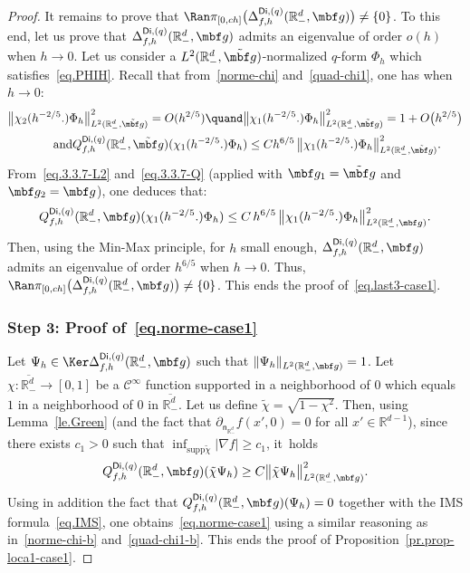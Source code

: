 \begin{proof}
It remains to prove that $\Ran \pi_{[0,ch]}\bigl(\Delta_{f,h}^{\mathsf{Di},(q)}(\mathbb R_-^d, \mbf g) \bigr)\neq \{0\}$. To this end, let us prove that $
\Delta_{f,h}^{\mathsf{Di},(q)}(\mathbb R^d_-,\mbf g)$ admits an eigenvalue of order $o(h)$ when $h\to 0$.
Let us consider a $L^2(\mathbb R^d_-,\tilde{\mbf g})$-normalized $q$-form $\Phi_h$ which satisfies~\eqref{eq.PHIH}.
Recall that from~\eqref{norme-chi} and~\eqref{quad-chi1}, one has when $h\to 0$:
\begin{gather*}
\big\Vert \chi_2(h^{-2/5 }.) \Phi_h\big \Vert_{L^2(\mathbb R_-^d,\tilde{\mbf g})}^2 =O(h^{2/5 }) \quand \big\Vert \chi_1(h^{-2/5 }.) \Phi_h\big\Vert_{L^2(\mathbb R_-^d,\tilde{\mbf g})}^2=1+O\bigl(h^{2/5 }\bigr)
\\
\tag*{and}
Q_{f,h}^{\mathsf{Di},(q)}(\mathbb R^d_-,\tilde{\mbf g})(\chi_1(h^{-2/5 }.)\Phi_h)\le C h^{ 6/5} \, \big \Vert \chi_1(h^{-2/5 }.)\Phi_h\big \Vert_{L^2(\mathbb R^d_-,\tilde{\mbf g})}^2.
\end{gather*}
From~\eqref{eq.3.3.7-L2} and~\eqref{eq.3.3.7-Q} (applied with $\mbf g_1=\tilde{\mbf g}$ and $\mbf g_2=\mbf g$), one deduces that:
\begin{equation}\label{bes2}
Q_{f,h}^{\mathsf{Di},(q)}(\mathbb R^d_-,\mbf g)(\chi_1(h^{-2/5 }.)\Phi_h)\le C\, h^{6/5}\, \big \Vert \chi_1(h^{-2/5 }.)\Phi_h\big \Vert_{L^2(\mathbb R^d_-,\mbf g)}^2.
\end{equation}
Then, using the Min-Max principle, for $h$ small enough, $
\Delta_{f,h}^{\mathsf{Di},(q)}(\mathbb R^d_-,\mbf g)$ admits an eigenvalue of order $ h^{ 6/5}$ when $h\to 0$. Thus, $\Ran \pi_{[0,ch]}\bigl(\Delta_{f,h}^{\mathsf{Di},(q)}(\mathbb R_-^d, \mbf g) \bigr)\neq \{0\}$.
This ends the proof of~\eqref{eq.last3-case1}.

\subsubsection*{Step 3: Proof of~\eqref{eq.norme-case1}}
Let $\Psi_h\in \Ker \Delta_{f,h}^{\mathsf{Di},(q)}(\mathbb R^d_-,\mbf g)$ such that $ \Vert \Psi_h \Vert_{L^2(\mathbb R^d_-,\mbf g)}=1$. Let $\chi: \overline{\mathbb R^{d}_-}\to [0,1]$ be a $\mathcal C^\infty$ function supported in a neighborhood of $0$ which equals~$1$ in a neighborhood of $0$ in $\overline{\mathbb R^{d}_-}$. Let us define $\tilde \chi=\sqrt{1-\chi^2}$. Then, using Lemma~\ref{le.Green} (and the fact that $\partial_{\mathsf n_{\mathbb R^d_-}}f(x',0)=0$ for all $x'\in \mathbb R^{d-1}$), since there exists $c_1>0$ such that $\inf_{\text{supp}\tilde \chi}\vert \nabla f\vert \ge c_1 $, it~holds
\[
Q_{f,h}^{\mathsf{Di},(q)}(\mathbb R^d_-,\mbf g)(\tilde \chi \Psi_h)\ge C \big \Vert \tilde \chi \Psi_h\big \Vert_{L^2(\mathbb R^d_-,\mbf g)}^2.
\]
Using in addition the fact that $Q_{f,h}^{\mathsf{Di},(q)}(\mathbb R^d_-,\mbf g)(\Psi_h)=0$ together with the IMS formula~\eqref{eq.IMS}, one obtains~\eqref{eq.norme-case1} using a similar reasoning as in~\eqref{norme-chi-b} and~\eqref{quad-chi1-b}. This ends the proof of Proposition~\ref{pr.prop-loca1-case1}.
\end{proof}

